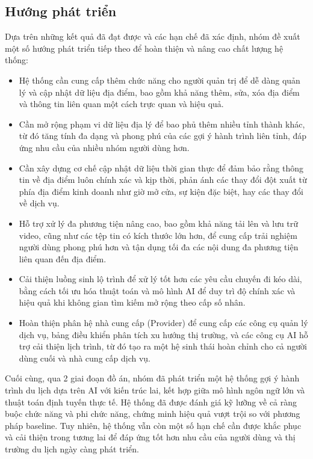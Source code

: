 \subsection{Hướng phát triển}
Dựa trên những kết quả đã đạt được và các hạn chế đã xác định, nhóm đề xuất một số hướng phát triển tiếp theo để hoàn thiện và nâng cao chất lượng hệ thống:
\begin{itemize}
    \item Hệ thống cần cung cấp thêm chức năng cho người quản trị để dễ dàng quản lý và cập nhật dữ liệu địa điểm, bao gồm khả năng thêm, sửa, xóa địa điểm và thông tin liên quan một cách trực quan và hiệu quả.
    \item Cần mở rộng phạm vi dữ liệu địa lý để bao phủ thêm nhiều tỉnh thành khác, từ đó tăng tính đa dạng và phong phú của các gợi ý hành trình liên tỉnh, đáp ứng nhu cầu của nhiều nhóm người dùng hơn.
    \item Cần xây dựng cơ chế cập nhật dữ liệu thời gian thực để đảm bảo rằng thông tin về địa điểm luôn chính xác và kịp thời, phản ánh các thay đổi đột xuất từ phía địa điểm kinh doanh như giờ mở cửa, sự kiện đặc biệt, hay các thay đổi về dịch vụ.
    \item Hỗ trợ xử lý đa phương tiện nâng cao, bao gồm khả năng tải lên và lưu trữ video, cũng như các tệp tin có kích thước lớn hơn, để cung cấp trải nghiệm người dùng phong phú hơn và tận dụng tối đa các nội dung đa phương tiện liên quan đến địa điểm.
    \item Cải thiện luồng sinh lộ trình để xử lý tốt hơn các yêu cầu chuyến đi kéo dài, bằng cách tối ưu hóa thuật toán và mô hình AI để duy trì độ chính xác và hiệu quả khi không gian tìm kiếm mở rộng theo cấp số nhân.
    \item Hoàn thiện phân hệ nhà cung cấp (Provider) để cung cấp các công cụ quản lý dịch vụ, bảng điều khiển phân tích xu hướng thị trường, và các công cụ AI hỗ trợ cải thiện lịch trình, từ đó tạo ra một hệ sinh thái hoàn chỉnh cho cả người dùng cuối và nhà cung cấp dịch vụ.
\end{itemize}

Cuối cùng, qua 2 giai đoạn đồ án, nhóm đã phát triển một hệ thống gợi ý hành trình du lịch dựa trên AI với kiến trúc lai, kết hợp giữa mô hình ngôn ngữ lớn và thuật toán định tuyến thực tế. Hệ thống đã được đánh giá kỹ lưỡng về cả ràng buộc chức năng và phi chức năng, chứng minh hiệu quả vượt trội so với phương pháp baseline. Tuy nhiên, hệ thống vẫn còn một số hạn chế cần được khắc phục và cải thiện trong tương lai để đáp ứng tốt hơn nhu cầu của người dùng và thị trường du lịch ngày càng phát triển.
